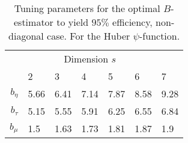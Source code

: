 \begin{table}[htbp!]
\begin{center}
{\small
\begin{tabular}{rllllll}
   \hline
  & \multicolumn{5}{c}{Dimension $s$} \\
  \cline{2-7}
  & 2 & 3 & 4 & 5 & 6 & 7 \\
   \hline
$b_\eta$ & 5.66 & 6.41 & 7.14 & 7.87 & 8.58 & 9.28 \\
  $b_\tau$ & 5.15 & 5.55 & 5.91 & 6.25 & 6.55 & 6.84 \\
  $b_\mu$ & 1.5 & 1.63 & 1.73 & 1.81 & 1.87 & 1.9 \\
   \hline
\end{tabular}
}
\caption{Tuning parameters for the optimal $B$-estimator to yield $95\%$
  efficiency, non-diagonal case. For the Huber $\psi$-function.}
\label{tab:effBOptimal}
\end{center}
\end{table}
